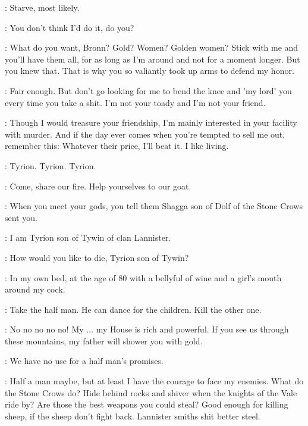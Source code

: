 \TYRION: Starve, most likely. 

\BRONN: You don't think I'd do it, do you? 

\TYRION: What do you want, Bronn? Gold? Women? Golden women? Stick with me and you'll have them all, for as long as I'm around and not for a moment longer. But you knew that. That is why you so valiantly took up arms to defend my honor. 

\BRONN: Fair enough.  But don't go looking for me to bend the knee and 'my lord' you every time you take a shit. I'm not your toady and I'm not your friend. 

\TYRION: Though I would treasure your friendship, I'm mainly interested in your facility with murder. And if the day ever comes when you're tempted to sell me out, remember this: Whatever their price, I'll beat it. I like living. 


\BRONN: Tyrion. Tyrion. Tyrion. 


\TYRION: Come, share our fire. Help yourselves to our goat. 

\SHAGGA: When you meet your gods, you tell them Shagga son of Dolf of the Stone Crows sent you. 

\TYRION: I am Tyrion son of Tywin of clan Lannister. 

\SHAGGA: How would you like to die, Tyrion son of Tywin? 

\TYRION: In my own bed, at the age of 80 with a bellyful of wine and a girl's mouth around my cock. 

\SHAGGA:  Take the half man. He can dance for the children. Kill the other one. 


\TYRION: No no no no no! My $\ldots$ my House is rich and powerful. If you see us through these mountains, my father will shower you with gold. 

\SHAGGA: We have no use for a half man's promises.

\TYRION: Half a man maybe, but at least I have the courage to face my enemies. What do the Stone Crows do? Hide behind rocks and shiver when the knights of the Vale ride by? Are those the best weapons you could steal? Good enough for killing sheep, if the sheep don't fight back. Lannister smiths shit better steel. 

